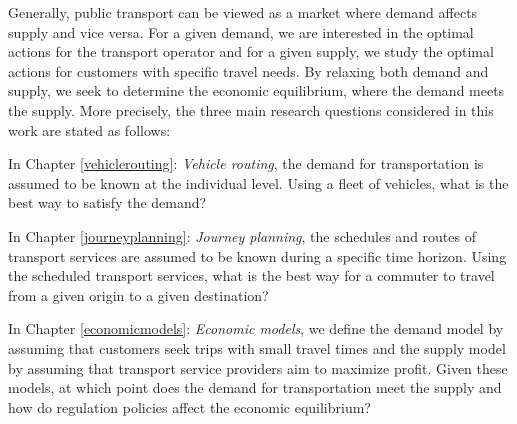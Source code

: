 \documentclass[dissertation,draft*]{aaltoseries}
\begin{document}
Generally, public transport can be viewed as a market where demand affects supply and vice versa.
For a given demand, we are interested in the optimal actions for the transport operator and for a given supply, 
we study the optimal actions for customers with specific travel needs. By relaxing both demand and supply, 
we seek to determine the economic equilibrium, where the demand meets the supply.
More precisely, the three main research questions considered in this work are stated as follows: 

In Chapter \ref{vehiclerouting}: \emph{Vehicle routing}, the demand for transportation is assumed to be known at the individual level. 
Using a fleet of vehicles, what is the best way to satisfy the demand? 

In Chapter \ref{journeyplanning}: \emph{Journey planning}, the schedules and routes of transport services are assumed to be known during a specific time horizon.
Using the scheduled transport services, what is the best way for a commuter to travel from a given origin to a given destination?

In Chapter \ref{economicmodels}: \emph{Economic models}, we define the demand model by assuming that customers seek trips with
small travel times and the supply model by assuming that transport service providers aim to maximize profit. Given these models,
at which point does the demand for transportation meet the supply and how do regulation policies affect the economic equilibrium?

% 
% 
% 
%    
\end{document}
